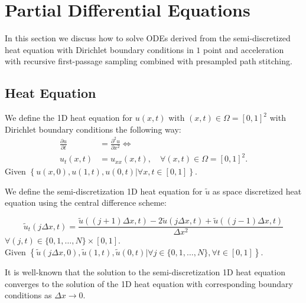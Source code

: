 \documentclass[a4paper,12pt]{article}
\begin{document}
\section{Partial Differential Equations}

In this section we discuss how to solve ODEs derived from the semi-discretized heat equation
with Dirichlet boundary conditions in $1$ point and acceleration with recursive first-passage sampling
combined with presampled path stitching.

\subsection{Heat Equation}
\begin{definition} \label{def:heat equation square}
  We define the 1D heat equation for $u(x,t)$ with $ (x,t) \in \Omega = [0,1]^2$
  with Dirichlet boundary conditions the following way:
  \begin{align}
    \frac{\partial u}{\partial t} & = \frac{\partial^{2} u}{\partial x^{2}}  \Leftrightarrow   \\
    u_t(x,t)                      & = u_{xx}(x,t), \quad \forall (x,t) \in \Omega = [0,1]^2  .
  \end{align}
  Given $\left\{u(x,0),u(1,t),u(0,t) | \forall x,t \in [0,1]  \right\} $.
\end{definition}

\begin{definition} \label{def:discrete heat equation square}
  We define the semi-discretization 1D heat equation for $\tilde{u}$ as space discretized heat equation
  using the central difference scheme:

  \begin{equation}
    \tilde{u}_t(j \Delta x,t)  = \frac{\tilde{u}((j+1) \Delta x, t)-2\tilde{u}(j \Delta x, t)+\tilde{u}((j-1) \Delta x, t)}{\Delta x^{2}}
  \end{equation}
  $\forall (j,t) \in \{0, 1, \ldots, N\} \times [0,1]$. \\
  Given $\left\{\tilde{u}(j \Delta x,0),\tilde{u}(1,t),\tilde{u}(0,t) | \forall j \in \{0, 1, \ldots, N\}, \forall t \in  [0,1]  \right\} $.

  It is well-known that the solution to the semi-discretization 1D heat equation converges to the solution of the 1D heat equation with
  corresponding boundary conditions as $\Delta x \rightarrow 0$.
\end{definition}
\end{document}
